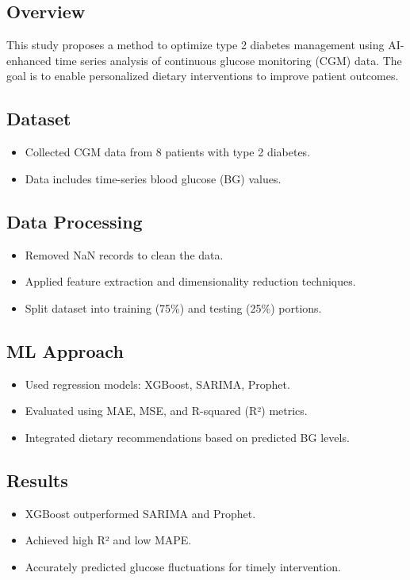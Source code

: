 \subsection*{Overview}
This study proposes a method to optimize type 2 diabetes management using AI-enhanced time series analysis of continuous glucose monitoring (CGM) data. The goal is to enable personalized dietary interventions to improve patient outcomes.

\subsection*{Dataset}
\begin{itemize}
    \item Collected CGM data from 8 patients with type 2 diabetes.
    \item Data includes time-series blood glucose (BG) values.
\end{itemize}

\subsection*{Data Processing}
\begin{itemize}
    \item Removed NaN records to clean the data.
    \item Applied feature extraction and dimensionality reduction techniques.
    \item Split dataset into training (75\%) and testing (25\%) portions.
\end{itemize}

\subsection*{ML Approach}
\begin{itemize}
    \item Used regression models: XGBoost, SARIMA, Prophet.
    \item Evaluated using MAE, MSE, and R-squared (R²) metrics.
    \item Integrated dietary recommendations based on predicted BG levels.
\end{itemize}

\subsection*{Results}
\begin{itemize}
    \item XGBoost outperformed SARIMA and Prophet.
    \item Achieved high R² and low MAPE.
    \item Accurately predicted glucose fluctuations for timely intervention.
\end{itemize}

